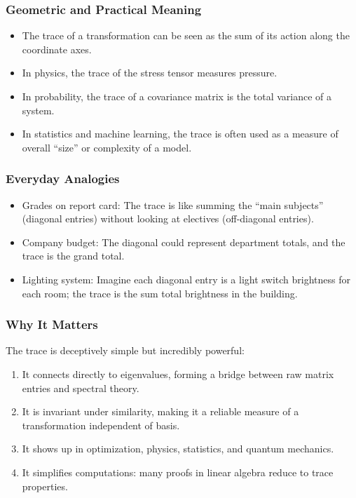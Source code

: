 \documentclass[
  letterpaper,
  DIV=11,
  numbers=noendperiod]{scrreprt}
\providecommand{\tightlist}{%
  \setlength{\itemsep}{0pt}\setlength{\parskip}{0pt}}
\begin{document}
\subsubsection{Geometric and Practical
Meaning}\label{geometric-and-practical-meaning}

\begin{itemize}
\tightlist
\item
  The trace of a transformation can be seen as the sum of its action
  along the coordinate axes.
\item
  In physics, the trace of the stress tensor measures pressure.
\item
  In probability, the trace of a covariance matrix is the total variance
  of a system.
\item
  In statistics and machine learning, the trace is often used as a
  measure of overall ``size'' or complexity of a model.
\end{itemize}

\subsubsection{Everyday Analogies}\label{everyday-analogies-14}

\begin{itemize}
\tightlist
\item
  Grades on report card: The trace is like summing the ``main subjects''
  (diagonal entries) without looking at electives (off-diagonal
  entries).
\item
  Company budget: The diagonal could represent department totals, and
  the trace is the grand total.
\item
  Lighting system: Imagine each diagonal entry is a light switch
  brightness for each room; the trace is the sum total brightness in the
  building.
\end{itemize}

\subsubsection{Why It Matters}\label{why-it-matters-14}

The trace is deceptively simple but incredibly powerful:

\begin{enumerate}
\def\labelenumi{\arabic{enumi}.}
\tightlist
\item
  It connects directly to eigenvalues, forming a bridge between raw
  matrix entries and spectral theory.
\item
  It is invariant under similarity, making it a reliable measure of a
  transformation independent of basis.
\item
  It shows up in optimization, physics, statistics, and quantum
  mechanics.
\item
  It simplifies computations: many proofs in linear algebra reduce to
  trace properties.
\end{enumerate}
\end{document}
